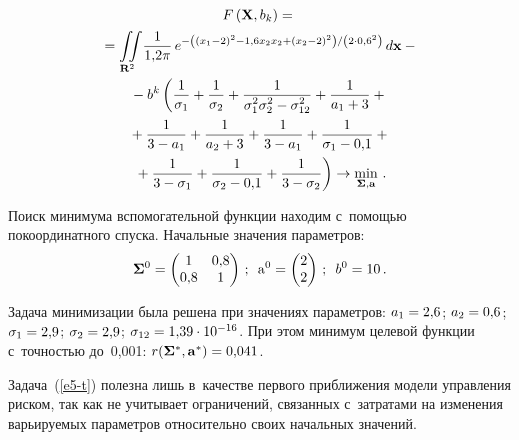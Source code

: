 \begin{multicols}{2}
    \noindent
    \begin{multline*}
    F\left( \mathbf{X}, b_k\right) ={}\\
    {}=\iint\limits_{\mathbf{R}^2} \!\fr{1}{1{,}2\pi} 
\,e^{- \left((x_1-2)^2 -1{,}6x_2x_2+(x_2-2)^2\right)/\left(2\cdot 0{,}6^2\right)} \,d\mathbf{x} -{}\\
{}-
b^k\left( \fr{1}{\sigma_1} +\fr{1}{\sigma_2}+\fr{1}{\sigma_1^2 \sigma_2^2-
\sigma_{12}^2} +\fr{1}{a_1+3}+ {}\right.\\
{}+\fr{1}{3-a_1}+ \fr{1}{a_2+3} +\fr{1}{3-a_1} 
+\fr{1}{\sigma_1-0{,}1} +{}\\
\left.{}+\fr{1}{3-\sigma_1} +\fr{1}{\sigma_2 -0{,}1} +\fr{1}{3-
\sigma_2}\right) \to \min\limits_{\boldsymbol{\Sigma}, \mathbf{a}}\,.
    \end{multline*}
  
  Поиск минимума вспомогательной функ\-ции находим с~по\-мощью 
покоординатного спус\-ка. Начальные значения па\-ра\-мет\-ров:
  $$
  \boldsymbol{\Sigma}^0=\begin{pmatrix}
  1 & 0{,}8\\
  0{,}8 & 1
  \end{pmatrix}\,;\enskip \mathrm{a}^0=\begin{pmatrix}
  2\\ 2\end{pmatrix}\,;\enskip b^0=10\,.
  $$
  
  Задача минимизации была решена при значениях па\-ра\-мет\-ров: 
$a_1\hm=2{,}6$; $a_2\hm=0{,}6$; $\sigma_1\hm=2{,}9$; $\sigma_2\hm=2{,}9$; 
$\sigma_{12}\hm= 1{,}39\cdot 10^{-16}$. При этом минимум целевой функ\-ции 
с~точ\-ностью до~0,001:  $r(\boldsymbol{\Sigma}^*, \mathbf{a}^*)\hm= 
0{,}041$.
  
  Задача~(\ref{e5-t}) полезна лишь в~качестве первого приб\-ли\-же\-ния модели 
управ\-ле\-ния рис\-ком, так как не учитывает ограничений, связанных с~за\-тра\-та\-ми 
на изменения варь\-и\-ру\-емых па\-ра\-мет\-ров относительно своих начальных 
значений.
  

\end{multicols}
